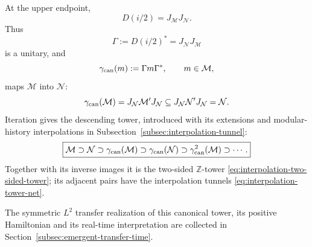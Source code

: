 \documentclass[a4paper,11pt]{article}
\theoremstyle{definition}
\newcommand{\mN}{\mathcal{N}}
\newcommand{\mM}{\mathcal{M}}
\begin{document}
At the upper endpoint,
\begin{equation}
    \boxed{
    D(i/2)=J_{\mM}J_{\mN} .
    }
    \label{eq:D-half-common}
\end{equation}
Thus
\begin{equation}
    \Gamma:=D(i/2)^*=J_{\mN}J_{\mM}
\end{equation}
is a unitary, and
\begin{equation}
    \gamma_{\rm can}(m)
    :=
    \Gamma m\Gamma^*,
    \qquad
    m\in\mM,
    \label{eq:canonical-endomorphism-common}
\end{equation}
maps $\mM$ into $\mN$:
\begin{equation}
    \gamma_{\rm can}(\mM)
    =
    J_{\mN}\mM'J_{\mN}
    \subseteq
    J_{\mN}\mN'J_{\mN}
    =
    \mN .
\end{equation}
Iteration gives the descending tower, introduced with its extensions
and modular-history interpolations in
Subsection~\ref{subsec:interpolation-tunnel}:
\begin{equation}
    \boxed{
    \mM
    \supset
    \mN
    \supset
    \gamma_{\rm can}(\mM)
    \supset
    \gamma_{\rm can}(\mN)
    \supset
    \gamma_{\rm can}^2(\mM)
    \supset\cdots .
    }
    \label{eq:canonical-discrete-tower}
\end{equation}
Together with its inverse images it is the two-sided $\mathbb Z$-tower
\eqref{eq:interpolation-two-sided-tower}; its adjacent pairs have the
interpolation tunnels \eqref{eq:interpolation-tower-net}.

The symmetric $L^2$ transfer realization of this canonical tower,
its positive Hamiltonian and its real-time interpretation are collected in
Section~\ref{subsec:emergent-transfer-time}.
\end{document}
